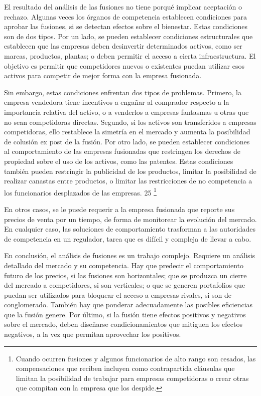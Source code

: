 \documentclass[
  12pt,
  spanish,
]{book}
\begin{document}
El resultado del análisis de las fusiones no tiene porqué implicar
aceptación o rechazo. Algunas veces los órganos de competencia
establecen condiciones para aprobar las fusiones, si se detectan efectos
sobre el bienestar. Estas condiciones son de dos tipos. Por un lado, se
pueden establecer condiciones estructurales que establecen que las
empresas deben desinvertir determinados activos, como ser marcas,
productos, plantas; o deben permitir el acceso a cierta infraestructura.
El objetivo es permitir que competidores nuevos o existentes puedan
utilizar esos activos para competir de mejor forma con la empresa
fusionada.

Sin embargo, estas condiciones enfrentan dos tipos de problemas.
Primero, la empresa vendedora tiene incentivos a engañar al comprador
respecto a la importancia relativa del activo, o a venderlos a empresas
fantasmas u otras que no sean competidoras directas. Segundo, si los
activos son transferidos a empresas competidoras, ello restablece la
simetría en el mercado y aumenta la posibilidad de colusión ex post de
la fusión. Por otro lado, se pueden establecer condiciones al
comportamiento de las empresas fusionadas que restringen los derechos de
propiedad sobre el uso de los activos, como las patentes. Estas
condiciones también pueden restringir la publicidad de los productos,
limitar la posibilidad de realizar canastas entre productos, o limitar
las restricciones de no competencia a los funcionarios desplazados de
las empresas. 25 \footnote{Cuando ocurren fusiones y algunos
  funcionarios de alto rango son cesados, las compensaciones que reciben
  incluyen como contrapartida cláusulas que limitan la posibilidad de
  trabajar para empresas competidoras o crear otras que compitan con la
  empresa que los despide.}

En otros casos, se le puede requerir a la empresa fusionada que reporte
sus precios de venta por un tiempo, de forma de monitorear la evolución
del mercado. En cualquier caso, las soluciones de comportamiento
trasforman a las autoridades de competencia en un regulador, tarea que
es difícil y compleja de llevar a cabo.

En conclusión, el análisis de fusiones es un trabajo complejo. Requiere
un análisis detallado del mercado y su competencia. Hay que predecir el
comportamiento futuro de los precios, si las fusiones son horizontales;
que se produzca un cierre del mercado a competidores, si son verticales;
o que se generen portafolios que puedan ser utilizados para bloquear el
acceso a empresas rivales, si son de conglomerado. También hay que
ponderar adecuadamente las posibles eficiencias que la fusión genere.
Por último, si la fusión tiene efectos positivos y negativos sobre el
mercado, deben diseñarse condicionamientos que mitiguen los efectos
negativos, a la vez que permitan aprovechar los positivos.
\end{document}

